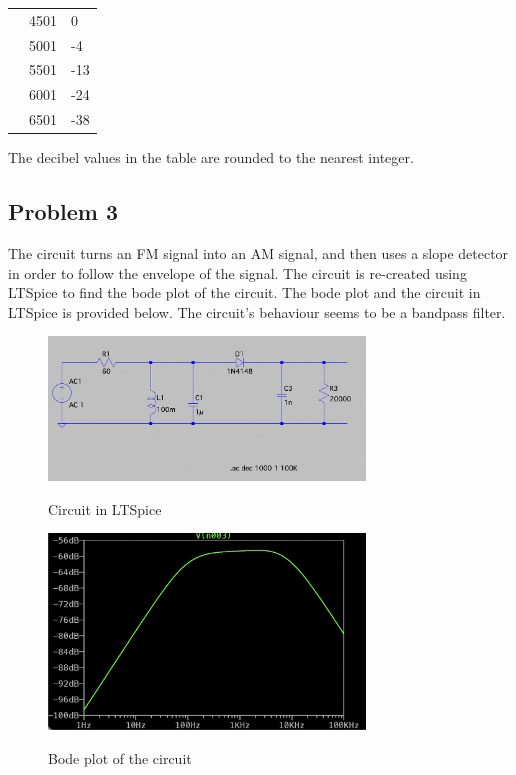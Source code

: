 \begin{table}[H]
\begin{tabular}{|c|l|l|}
                                        & 4501                      & 0                             \\ \cline{2-3}
                                        & 5001                      & -4                            \\ \cline{2-3}
                                        & 5501                      & -13                           \\ \cline{2-3}
                                        & 6001                      & -24                           \\ \cline{2-3}
                                        & 6501                      & -38                           \\ \hline
    \end{tabular}
\end{table}

The decibel values in the table are rounded to the nearest integer.

\subsection{Problem 3}
The circuit turns an FM signal into an AM signal, and then uses a slope detector in order to follow the envelope of the signal. The circuit is re-created using LTSpice to find the bode plot of the circuit. The bode plot and the circuit in LTSpice is provided below. The circuit's behaviour seems to be a bandpass filter.

\begin{figure}[H]
    \centering
    \includegraphics[width=0.75\textwidth]{images/prelab_6_circuit.png}
    \label{fig:prelab_06_circuit}
    \caption{Circuit in LTSpice}
\end{figure}

\begin{figure}[H]
    \centering
    \includegraphics[width=0.75\textwidth]{images/prelab_6_bandpass.png}
    \label{fig:prelab_06_bandpass}
    \caption{Bode plot of the circuit}
\end{figure}

